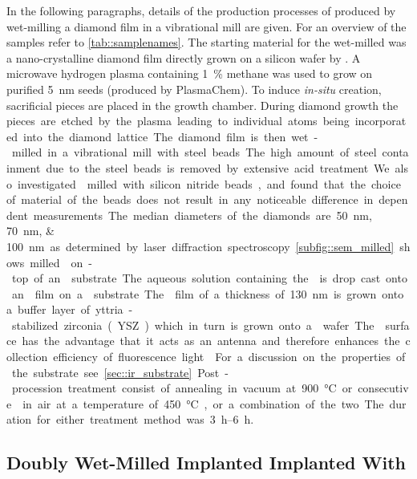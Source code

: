 		In the following paragraphs, details of the production processes of \nd produced by wet-milling a \CVD diamond film in a vibrational mill are given.
		For an overview of the samples refer to \autoref{tab::samplenames}.
		The starting material for the wet-milled \nds was a nano-crystalline diamond film \cite{Williams2006a} directly grown on a silicon wafer by \CVD.
		A microwave hydrogen plasma containing \SI{1}{\percent} methane was used to grow on purified \SI{5}{\nano\meter} \nd seeds (produced by PlasmaChem).
		To induce \textit{in-situ} \siv creation, sacrificial \Si pieces are placed in the growth chamber.
		During diamond growth the \si pieces are etched by the plasma leading to individual atoms being incorporated into the diamond lattice.
		The diamond film is then wet-milled in a vibrational mill with steel beads.
		The high amount of steel containment due to the steel beads is removed by extensive acid treatment.
		We also investigated \nds milled with silicon nitride beads, and found that the choice of material of the beads does not result in any noticeable difference in dependent measurements.
		The median diameters of the diamonds are \SIlist{50; 70; 100}{\nano\meter} as determined by laser diffraction spectroscopy. \autoref{subfig::sem_milled} shows milled \nds on-top of an \ir substrate.
		The aqueous solution containing the \nds is drop cast onto an \ir film on a \Si substrate.
		The \ir film of a thickness of \SI{130}{nm} is grown onto a buffer layer of yttria-stabilized zirconia (YSZ) which in turn is grown onto a \Si wafer.
		The \ir surface has the advantage that it acts as an antenna and therefore enhances the collection efficiency of fluorescence light \cite{Neu2012a}. For a discussion on the properties of the substrate see \autoref{sec::ir_substrate}.
		Post-procession treatment consist of annealing in vacuum at \SI{900}{\degreeCelsius} or consecutive \ox in air at a temperature of \SI{450}{\degreeCelsius}, or a combination of the two.
		The duration for either treatment method was \SIrange{3}{6}{\hour}.

	\subsection{Doubly Wet-Milled Implanted \Nds Implanted With \Si}\label{subsec::2_milled_nds}

